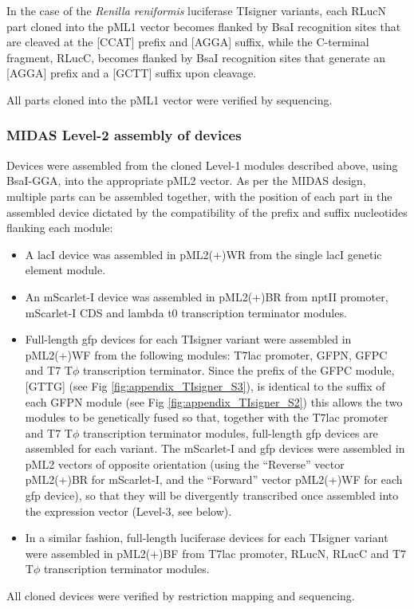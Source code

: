 In the case of the \textit{Renilla reniformis} luciferase TIsigner variants, each RLucN part cloned into the pML1 vector becomes flanked by BsaI recognition sites that are cleaved at the [CCAT] prefix and [AGGA] suffix, while the C-terminal fragment, RLucC, becomes flanked by BsaI recognition sites that generate an [AGGA] prefix and a [GCTT] suffix upon cleavage.

All parts cloned into the pML1 vector were verified by sequencing.


\subsubsection{MIDAS Level-2 assembly of devices}
Devices were assembled from the cloned Level-1 modules described above, using BsaI-GGA, into the appropriate pML2 vector. As per the MIDAS design, multiple parts can be assembled together, with the position of each part in the assembled device dictated by the compatibility of the prefix and suffix nucleotides flanking each module:
\begin{itemize}
\item A lacI device was assembled in pML2(+)WR from the single lacI genetic element module.
\item An mScarlet-I device was assembled in pML2(+)BR from nptII promoter, mScarlet-I CDS and lambda t0 transcription terminator modules.
\item Full-length gfp devices for each TIsigner variant were assembled in pML2(+)WF from the following modules: T7lac promoter, GFPN, GFPC and T7 T$\phi$ transcription terminator. Since the prefix of the GFPC module, [GTTG] (see Fig \ref{fig:appendix_TIsigner_S3}), is identical to the suffix of each GFPN module (see Fig \ref{fig:appendix_TIsigner_S2}) this allows the two modules to be genetically fused so that, together with the T7lac promoter and T7 T$\phi$ transcription terminator modules, full-length gfp devices are assembled for each variant. The mScarlet-I and gfp devices were assembled in pML2 vectors of opposite orientation (using the “Reverse” vector pML2(+)BR for mScarlet-I, and the “Forward” vector pML2(+)WF for each gfp device), so that they will be divergently transcribed once assembled into the expression vector (Level-3, see below).
\item In a similar fashion, full-length luciferase devices for each TIsigner variant were assembled in pML2(+)BF from T7lac promoter, RLucN, RLucC and T7 T$\phi$ transcription terminator modules.
\end{itemize}
All cloned devices were verified by restriction mapping and sequencing.

